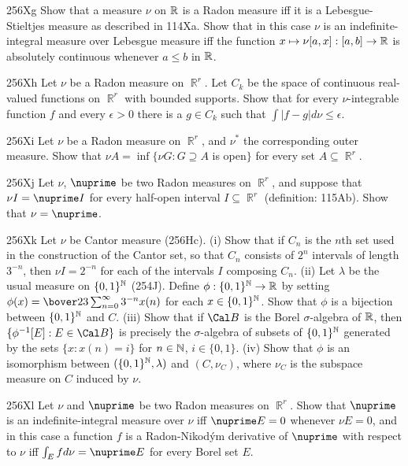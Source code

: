 {\sqheader 256Xg Show that a measure $\nu$ on $\Bbb R$ is a
Radon measure iff it is a Lebesgue-Stieltjes measure as
described in 114Xa.   Show that in this case $\nu$ is an
indefinite-integral measure over Lebesgue measure iff the function
$x\mapsto\nu[a,x]:[a,b]\to\Bbb R$ is
absolutely continuous whenever $a\le b$ in $\Bbb R$.

\spheader 256Xh Let $\nu$ be a Radon measure on $\BbbR^r$.   Let
$C_k$ be the space of continuous real-valued functions on
$\BbbR^r$ with bounded supports.   Show that for every
$\nu$-integrable function $f$ and every $\epsilon>0$ there is a
$g\in C_k$ such that $\int|f-g|d\nu\le\epsilon$.   

\spheader 256Xi Let $\nu$ be a Radon measure on $\BbbR^r$, and $\nu^*$ the
corresponding outer measure.   Show that
$\nu A=\inf\{\nu G:G\supseteq A$ is open$\}$ for every set
$A\subseteq\BbbR^r$.

\spheader 256Xj Let $\nu$, $\nuprime$ be two Radon measures on
$\BbbR^r$, and
suppose that $\nu I=\nuprime I$ for every half-open interval
$I\subseteq\BbbR^r$ (definition:  115Ab).   Show that $\nu=\nuprime$.

\spheader 256Xk Let $\nu$ be Cantor measure (256Hc).
(i) Show that if $C_n$ is the $n$th set used in the construction of the
Cantor set, so that $C_n$ consists of $2^n$ intervals of length
$3^{-n}$, then $\nu I=2^{-n}$ for each of the intervals $I$ composing
$C_n$.   (ii) Let $\lambda$ be the usual measure on $\{0,1\}^{\Bbb N}$
(254J).   Define $\phi:\{0,1\}^{\Bbb N}\to \Bbb R$ by setting
$\phi(x)=\bover23\sum_{n=0}^{\infty}3^{-n}x(n)$ for each
$x\in\{0,1\}^{\Bbb N}$.   Show that $\phi$ is a bijection between
$\{0,1\}^{\Bbb N}$ and $C$.   (iii) Show that if $\Cal B$ is the Borel
$\sigma$-algebra of $\Bbb R$, then $\{\phi^{-1}[E]:E\in\Cal B\}$ is
precisely the $\sigma$-algebra of subsets of $\{0,1\}^{\Bbb N}$
generated by the sets $\{x:x(n)=i\}$ for
$n\in\Bbb N$, $i\in\{0,1\}$.   (iv) Show that $\phi$ is an isomorphism
between $(\{0,1\}^{\Bbb N},\lambda)$ and $(C,\nu_C)$, where $\nu_C$ is
the subspace measure on $C$ induced by $\nu$.

\spheader 256Xl Let $\nu$ and $\nuprime$ be two Radon measures on
$\BbbR^r$.   Show that $\nuprime$ is an indefinite-integral measure over
$\nu$ iff $\nuprime E=0$ whenever $\nu E=0$, and in this case a function
$f$ is a Radon-Nikod\'ym derivative of $\nuprime$ with respect to $\nu$
iff $\int_Efd\nu=\nuprime E$ for every Borel set $E$.

}
